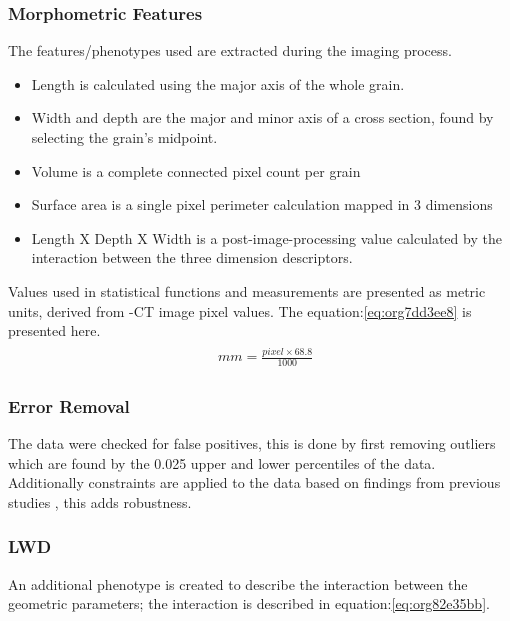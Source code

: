 \documentclass[a4paper, twocolumn]{article}
\begin{document}
\subsubsection{Morphometric Features}
\label{sec:orgb71a6af}

The features/phenotypes used are extracted during the imaging process.

\begin{itemize}
\item Length is calculated using the major axis of the whole grain.
\item Width and depth are the major and minor axis of a cross section, found by selecting the grain's midpoint.
\item Volume is a complete connected pixel count per grain
\item Surface area is a single pixel perimeter calculation mapped in 3 dimensions
\item Length X Depth X Width is a post-image-processing value calculated by the interaction between the three dimension descriptors.
\end{itemize}

Values used in statistical functions and measurements are presented as metric units, derived from \textmu{}-CT image pixel values. The equation:\ref{eq:org7dd3ee8} is presented here.
\begin{align}
\label{eq:org7dd3ee8}
  &\begin{aligned}
mm = \frac{pixel \times 68.8}{1000}
  \end{aligned}
\end{align}

\subsubsection{Error Removal}
\label{sec:orgd69cf0f}
The data were checked for false positives, this is done by first removing outliers which are found by the 0.025 upper and lower percentiles of the data. Additionally constraints are applied to the data based on findings from previous studies \cite{Hughes2017}, this adds robustness.

\subsubsection{LWD}
\label{sec:org8403576}
An additional phenotype is created to describe the interaction between the geometric parameters; the interaction is described in equation:\ref{eq:org82e35bb}.
\end{document}
